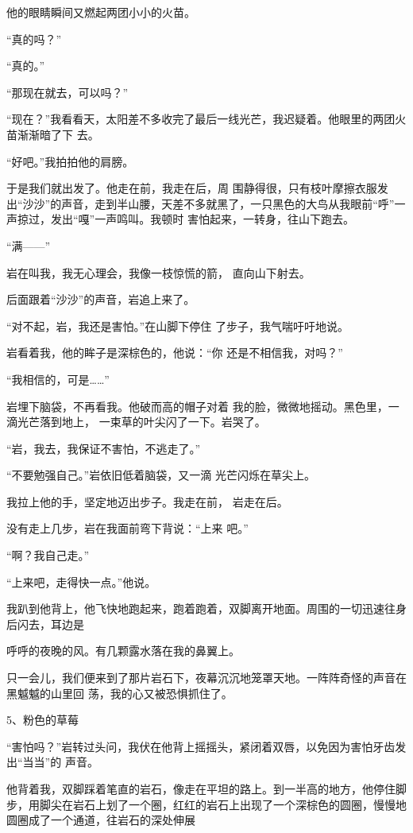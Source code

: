 \documentclass{article}
\begin{document}
他的眼睛瞬间又燃起两团小小的火苗。 


“真的吗？” 


“真的。” 


“那现在就去，可以吗？” 

“现在？”我看看天，太阳差不多收完了最后一线光芒，我迟疑着。他眼里的两团火苗渐渐暗了下
去。 


“好吧。”我拍拍他的肩膀。 

于是我们就出发了。他走在前，我走在后，周
\newpage
围静得很，只有枝叶摩擦衣服发出“沙沙”的声音，走到半山腰，天差不多就黑了，一只黑色的大鸟从我眼前“呼”一声掠过，发出“嘎”一声鸣叫。我顿时
害怕起来，一转身，往山下跑去。 


“满——” 

岩在叫我，我无心理会，我像一枝惊慌的箭，
直向山下射去。 


后面跟着“沙沙”的声音，岩追上来了。 

“对不起，岩，我还是害怕。”在山脚下停住
了步子，我气喘吁吁地说。 

岩看着我，他的眸子是深棕色的，他说：“你
还是不相信我，对吗？” 


“我相信的，可是……” 

岩埋下脑袋，不再看我。他破而高的帽子对着
\newpage
我的脸，微微地摇动。黑色里，一滴光芒落到地上，
一束草的叶尖闪了一下。岩哭了。 


“岩，我去，我保证不害怕，不逃走了。” 

“不要勉强自己。”岩依旧低着脑袋，又一滴
光芒闪烁在草尖上。 

我拉上他的手，坚定地迈出步子。我走在前，
岩走在后。 

没有走上几步，岩在我面前弯下背说：“上来
吧。” 


“啊？我自己走。” 


“上来吧，走得快一点。”他说。 

我趴到他背上，他飞快地跑起来，跑着跑着，双脚离开地面。周围的一切迅速往身后闪去，耳边是

\newpage
呼呼的夜晚的风。有几颗露水落在我的鼻翼上。 

只一会儿，我们便来到了那片岩石下，夜幕沉沉地笼罩天地。一阵阵奇怪的声音在黑魆魆的山里回
荡，我的心又被恐惧抓住了。 


5、粉色的草莓 

“害怕吗？”岩转过头问，我伏在他背上摇摇头，紧闭着双唇，以免因为害怕牙齿发出“当当”的
声音。 

他背着我，双脚踩着笔直的岩石，像走在平坦的路上。到一半高的地方，他停住脚步，用脚尖在岩石上划了一个圈，红红的岩石上出现了一个深棕色的圆圈，慢慢地圆圈成了一个通道，往岩石的深处伸展
\end{document}
